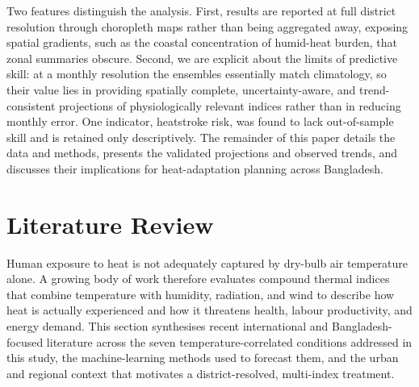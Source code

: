 \documentclass[review,11pt]{elsarticle}
\begin{document}
Two features distinguish the analysis. First, results are reported at full
district resolution through choropleth maps rather than being aggregated away, exposing
spatial gradients, such as the coastal concentration of humid-heat burden, that zonal summaries obscure. Second, we are explicit about the limits of predictive
skill: at a monthly resolution the ensembles essentially match climatology, so their
value lies in providing spatially complete, uncertainty-aware, and
trend-consistent projections of physiologically relevant indices rather than in
reducing monthly error. One indicator, heatstroke risk, was found to lack
out-of-sample skill and is retained only descriptively. The remainder of this
paper details the data and methods, presents the validated projections and
observed trends, and discusses their implications for heat-adaptation planning
across Bangladesh.

\section{Literature Review}\label{sec:litreview}

Human exposure to heat is not adequately captured by dry-bulb air temperature
alone. A growing body of work therefore evaluates compound thermal indices that
combine temperature with humidity, radiation, and wind to describe how heat is
actually experienced and how it threatens health, labour productivity, and energy
demand. This section synthesises recent international and Bangladesh-focused
literature across the seven temperature-correlated conditions addressed in this
study, the machine-learning methods used to forecast them, and the urban and
regional context that motivates a district-resolved, multi-index treatment.
\end{document}
